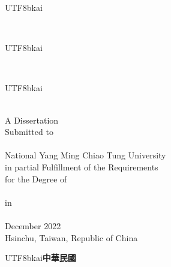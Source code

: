\begin{titlepage}
	\begin{center}
		\begin{CJK}{UTF8}{bkai}\universityCH \end{CJK}\\
		\begin{CJK}{UTF8}{bkai}\departmentCH\end{CJK}\\
		\begin{CJK}{UTF8}{bkai}\degreeCH \end{CJK}\\
		\vspace{8mm}
		A Dissertation\\
		Submitted to \\
		\SubmittedTo \\
		National Yang Ming Chiao Tung University\\
		in partial Fulfillment of the Requirements\\
		for the Degree of\\
		\DegreeType \\
		in\\
		\vspace{5mm}
		\DegreeIn \\
		\vspace{5mm}
		December 2022\\
		\vspace{5mm}
		Hsinchu, Taiwan, Republic of China\\
		\vspace*{\fill}
		\begin{CJK}{UTF8}{bkai}\textbf{中華民國\SubmitTimeCH}\end{CJK}\\
	\end{center}
\end{titlepage}



